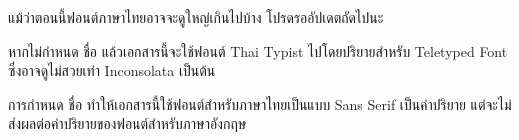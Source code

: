     แม้{\wbr}ว่า{\wbr}ตอน{\wbr}นี้{\wbr}ฟอนต์{\wbr}ภาษา{\wbr}ไทย{\wbr}อาจ{\wbr}จะ{\wbr}ดู{\wbr}ใหญ่{\wbr}เกิน{\wbr}ไป{\wbr}บ้าง โปรด{\wbr}รอ{\wbr}อัปเดต{\wbr}ถัด{\wbr}ไป{\wbr}นะ{\wbr}

    หาก{\wbr}ไม่{\wbr}กำหนด  ชื่อ  แล้ว{\wbr}เอกสาร{\wbr}นี้{\wbr}จะ{\wbr}ใช้{\wbr}ฟอนต์ Thai Typist ไป{\wbr}โดย{\wbr}ปริยาย{\wbr}สำหรับ Teletyped Font ซึ่ง{\wbr}อาจ{\wbr}ดู{\wbr}ไม่{\wbr}สวย{\wbr}เท่า Inconsolata เป็นต้น{\wbr}

    การ{\wbr}กำหนด  ชื่อ  ทำให้{\wbr}เอกสาร{\wbr}นี้{\wbr}ใช้{\wbr}ฟอนต์{\wbr}สำหรับ{\wbr}ภาษา{\wbr}ไทย{\wbr}เป็น{\wbr}แบบ Sans Serif เป็น{\wbr}ค่า{\wbr}ปริยาย แต่{\wbr}จะ{\wbr}ไม่{\wbr}ส่ง{\wbr}ผล{\wbr}ต่อ{\wbr}ค่า{\wbr}ปริยาย{\wbr}ของ{\wbr}ฟอนต์{\wbr}สำหรับ{\wbr}ภาษา{\wbr}อังกฤษ{\wbr}

